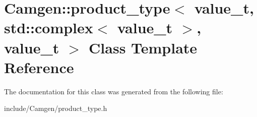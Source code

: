 \hypertarget{a00442}{}\section{Camgen\+:\+:product\+\_\+type$<$ value\+\_\+t, std\+:\+:complex$<$ value\+\_\+t $>$, value\+\_\+t $>$ Class Template Reference}
\label{a00442}


The documentation for this class was generated from the following file\+:\begin{DoxyCompactItemize}
\item 
include/\+Camgen/product\+\_\+type.\+h\end{DoxyCompactItemize}
